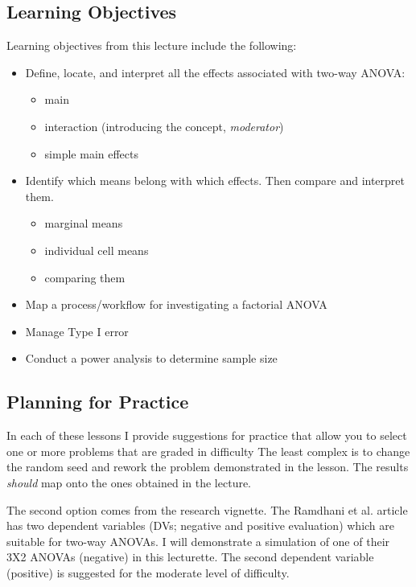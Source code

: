 \documentclass[
  11pt,
]{book}
\providecommand{\tightlist}{%
  \setlength{\itemsep}{0pt}\setlength{\parskip}{0pt}}
\begin{document}
\hypertarget{learning-objectives-6}{%
\subsection{Learning Objectives}\label{learning-objectives-6}}

Learning objectives from this lecture include the following:

\begin{itemize}
\tightlist
\item
  Define, locate, and interpret all the effects associated with two-way ANOVA:

  \begin{itemize}
  \tightlist
  \item
    main
  \item
    interaction (introducing the concept, \emph{moderator})
  \item
    simple main effects
  \end{itemize}
\item
  Identify which means belong with which effects. Then compare and interpret them.

  \begin{itemize}
  \tightlist
  \item
    marginal means
  \item
    individual cell means
  \item
    comparing them
  \end{itemize}
\item
  Map a process/workflow for investigating a factorial ANOVA
\item
  Manage Type I error
\item
  Conduct a power analysis to determine sample size
\end{itemize}

\hypertarget{planning-for-practice-5}{%
\subsection{Planning for Practice}\label{planning-for-practice-5}}

In each of these lessons I provide suggestions for practice that allow you to select one or more problems that are graded in difficulty The least complex is to change the random seed and rework the problem demonstrated in the lesson. The results \emph{should} map onto the ones obtained in the lecture.

The second option comes from the research vignette. The Ramdhani et al. \citeyearpar{ramdhani_affective_2018} article has two dependent variables (DVs; negative and positive evaluation) which are suitable for two-way ANOVAs. I will demonstrate a simulation of one of their 3X2 ANOVAs (negative) in this lecturette. The second dependent variable (positive) is suggested for the moderate level of difficulty.
\end{document}
